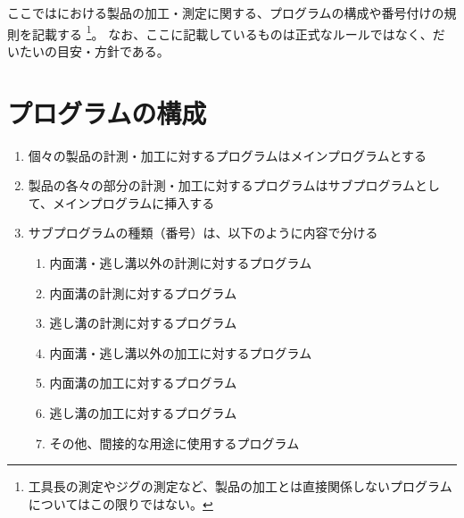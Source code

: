 
ここでは\DMname における製品の加工・測定に関する、プログラムの構成や番号付けの規則を記載する
\footnote{工具長の測定やジグの測定など、製品の加工とは直接関係しないプログラムについてはこの限りではない。}。
なお、ここに記載しているものは正式なルールではなく、だいたいの目安・方針である。


\section{プログラムの構成}
\begin{enumerate}
\item 個々の製品の計測・加工に対するプログラムはメインプログラムとする
\item 製品の各々の部分の計測・加工に対するプログラムはサブプログラムとして、メインプログラムに挿入する
\item サブプログラムの種類（番号）は、以下のように内容で分ける
  \begin{enumerate}
  \item 内面溝・逃し溝以外の計測に対するプログラム
  \item 内面溝の計測に対するプログラム
  \item 逃し溝の計測に対するプログラム
  \item 内面溝・逃し溝以外の加工に対するプログラム
  \item 内面溝の加工に対するプログラム
  \item 逃し溝の加工に対するプログラム
  \item その他、間接的な用途に使用するプログラム
  \end{enumerate}
\end{enumerate}



\clearpage
